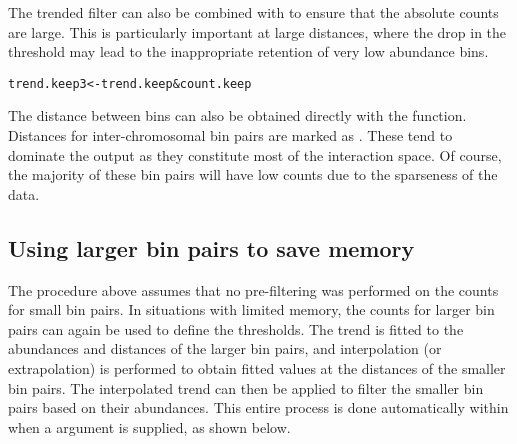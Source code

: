 \documentclass{report}\usepackage[]{graphicx}\usepackage[usenames,dvipsnames]{color}
\newcommand{\hlopt}[1]{\textcolor[rgb]{0,0,0}{#1}}%
\newcommand{\hlstd}[1]{\textcolor[rgb]{0.251,0.251,0.251}{#1}}%
\newcommand{\hlkwb}[1]{\textcolor[rgb]{0,0,0}{#1}}%
\newcommand{\hlkwc}[1]{\textcolor[rgb]{0.251,0.251,0.251}{#1}}%
\newcommand{\hlkwd}[1]{\textcolor[rgb]{0.878,0.439,0.125}{#1}}%
\newenvironment{knitrout}{}{} %
\begin{document}
The trended filter can also be combined with  to ensure that the absolute counts are large.
This is particularly important at large distances, where the drop in the threshold may lead to the inappropriate retention of very low abundance bins.

\begin{knitrout}
\color{fgcolor}\begin{kframe}
\begin{alltt}
\hlstd{trend.keep3} \hlkwb{<-} \hlstd{trend.keep} \hlopt{&} \hlstd{count.keep}
\end{alltt}
\end{kframe}
\end{knitrout}

The distance between bins can also be obtained directly with the  function.
Distances for inter-chromosomal bin pairs are marked as .
These tend to dominate the output as they constitute most of the interaction space.
Of course, the majority of these bin pairs will have low counts due to the sparseness of the data.

\subsection{Using larger bin pairs to save memory}
The procedure above assumes that no pre-filtering was performed on the counts for small bin pairs.
In situations with limited memory, the counts for larger bin pairs can again be used to define the thresholds.
The trend is fitted to the abundances and distances of the larger bin pairs, and interpolation (or extrapolation) is performed to obtain fitted values at the distances of the smaller bin pairs.
The interpolated trend can then be applied to filter the smaller bin pairs based on their abundances.
This entire process is done automatically within  when a  argument is supplied, as shown below.

\begin{knitrout}
\color{fgcolor}
\end{knitrout}
\end{document}
